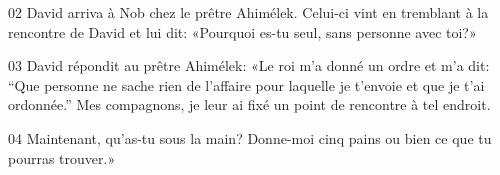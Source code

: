 
02 David arriva à Nob chez le prêtre Ahimélek. Celui-ci vint en tremblant à la rencontre de David et lui dit: «Pourquoi es-tu seul, sans personne avec toi?»

03 David répondit au prêtre Ahimélek: «Le roi m’a donné un ordre et m’a dit: “Que personne ne sache rien de l’affaire pour laquelle je t’envoie et que je t’ai ordonnée.” Mes compagnons, je leur ai fixé un point de rencontre à tel endroit.

04 Maintenant, qu’as-tu sous la main? Donne-moi cinq pains ou bien ce que tu pourras trouver.»

